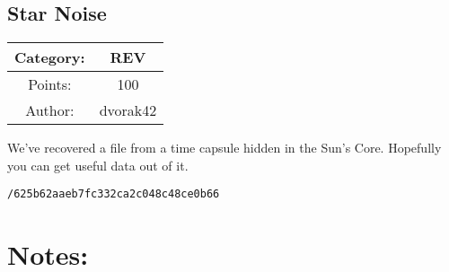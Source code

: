 \begin{center}
\section*{Star Noise}
{\large
\begin{tabular}{| c c |}
\hline
Category: & REV\\\hline
Points: & 100\\\hline
Author: & dvorak42\\\hline
\end{tabular}
}
\end{center}
\vspace{0.5in}

{\large
We've recovered a file from a time capsule hidden in the Sun's Core. Hopefully you can get useful data out of it.
}
\vspace{0.25in}
\begin{center}
  {\Large\tt /625b62aaeb7fc332ca2c048c48ce0b66}
\end{center}

\vspace{0.25in}
\section*{Notes:}

